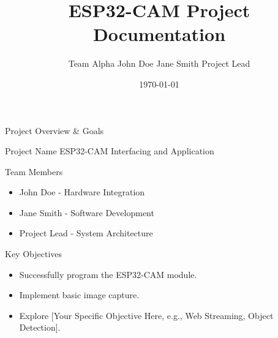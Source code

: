 \documentclass{beamer}
\title{ESP32-CAM Project Documentation}
\author{Team Alpha \newline John Doe \textbullet Jane Smith \textbullet Project Lead}
\date{\today}
\institute{University of Technology / Awesome Company Inc.}
\begin{document}
\begin{frame}
  \titlepage
\end{frame}

\begin{frame}{Project Overview \& Goals}
  \begin{block}{Project Name}
    ESP32-CAM Interfacing and Application
  \end{block}

  \begin{block}{Team Members}
    \begin{itemize}
        \item John Doe - Hardware Integration
        \item Jane Smith - Software Development
        \item Project Lead - System Architecture
    \end{itemize}
  \end{block}
  
  \begin{block}{Key Objectives}
    \begin{itemize}
        \item Successfully program the ESP32-CAM module.
        \item Implement basic image capture.
        \item Explore [Your Specific Objective Here, e.g., Web Streaming, Object Detection].
    \end{itemize}
  \end{block}
\end{frame}
\end{document}
